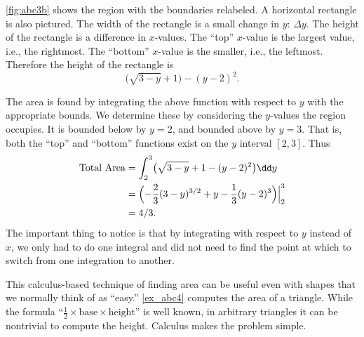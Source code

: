 \begin{example}
\autoref{fig:abc3b} shows the region with the boundaries relabeled. A
horizontal rectangle is also pictured. The width of the rectangle is a small change in $y$: $\Delta y$. The height of the rectangle is a difference in $x$-values. The ``top'' $x$-value is the largest value, i.e., the rightmost. The ``bottom'' $x$-value is the smaller, i.e., the leftmost. Therefore the height of the rectangle is
\[\bigl(\sqrt{3-y}+1\bigr) - (y-2)^2.\]

The area is found by integrating the above function with respect to $y$ with the appropriate bounds. We determine these by considering the $y$-values the region occupies. It is bounded below by $y=2$, and bounded above by $y=3$. That is, both the ``top'' and ``bottom'' functions exist on the $y$ interval $[2,3]$. Thus
\begin{align*}
	\text{Total Area}
	&= \int_2^3 \bigl(\sqrt{3-y}+1 - (y-2)^2\bigr)\dd y \\
	&= \Bigl(-\frac23(3-y)^{3/2}+y-\frac13(y-2)^3\Bigr)\Big|_2^3 \\
	&= 4/3.
\end{align*}
The important thing to notice is that by integrating with respect to $y$ instead of $x$, we only had to do one integral and did not need to find the point at which to switch from one integration to another.
\end{example}

This calculus-based technique of finding area can be useful even with shapes that we normally think of as ``easy.'' \autoref{ex_abc4} computes the area of a triangle. While the formula ``$\frac12\times\text{base}\times\text{height}$'' is well known, in arbitrary triangles it can be nontrivial to compute the height. Calculus makes the problem simple.

